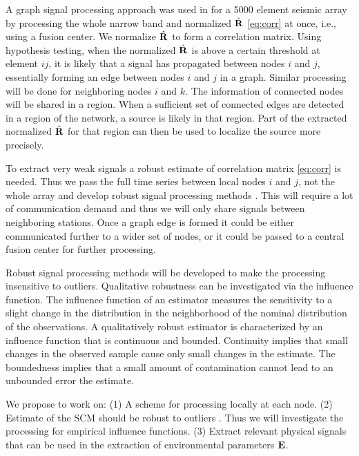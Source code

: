 A graph signal processing approach was used in \cite{riahi2017} for a 5000 element seismic array by processing the whole narrow band and normalized $\hat{\bf R}$ \eqref{eq:corr} at once, i.e., using a fusion center. We normalize 
$\hat{\bf R}$ to form a correlation matrix. %
Using hypothesis testing, when the  normalized $\hat{\bf R }$ is above a certain threshold at  element $ij$, it is likely that a signal has propagated between nodes $i$ and $j$, essentially forming an edge between nodes  $i$ and $j$ in a graph. Similar processing will be done for neighboring nodes $i$ and $k$. The information of connected nodes will be shared in a region. When a sufficient set of connected edges are detected in a region of the network, a source is likely in that region. Part of the extracted normalized $\hat{\bf R}$ for that region can then be used to localize the source more precisely.

To extract very weak signals a robust estimate of correlation matrix \eqref{eq:corr} is needed.  Thus we  pass the full time series between local nodes $i$ and $j$, not the whole array and develop robust signal processing methods \cite{zoubir2018}. This will require a lot of communication demand and thus we will only share signals between neighboring stations. Once a graph edge is formed it could  be either communicated further to a wider set of nodes, or it could be passed to a central fusion center for further processing. 

Robust signal processing methods \cite{zoubir2018} will be developed to make the processing insensitive to outliers. Qualitative robustness can be investigated via the influence function. The influence function  of an estimator 
measures the sensitivity to a slight change in the distribution
in the neighborhood of the nominal distribution of the observations. 
A qualitatively robust estimator is characterized by an influence function that is continuous and bounded. Continuity implies that small changes in the observed sample cause only small changes in the estimate. The boundedness implies that a small amount of contamination cannot lead to an unbounded error the estimate.

We propose to work on:
(1) A scheme for processing locally at each node. 
(2) Estimate of the SCM should be robust to outliers \cite{zoubir2018}. Thus we will investigate the processing for empirical influence functions.  %
(3) Extract relevant physical signals that can be used in the extraction of environmental parameters $\bf E$.

